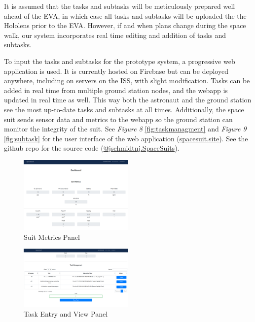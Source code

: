 \documentclass{article}
\begin{document}
It is assumed that the tasks and subtasks will be meticulously prepared well ahead of the EVA, in which case all tasks and subtasks will be uploaded the the Hololens prior to the EVA. However, if and when plans change during the space walk, our system incorporates real time editing and addition of tasks and subtasks.

To input the tasks and subtasks for the prototype system, a progressive web application is used. It is currently hosted on Firebase but can be deployed anywhere, including on servers on the ISS, with slight modification. Tasks can be added in real time from multiple ground station nodes, and the webapp is updated in real time as well. This way both the astronaut and the ground station see the most up-to-date tasks and subtasks at all times. Additionally, the space suit sends sensor data and metrics to the webapp so the ground station can monitor the integrity of the suit. See \textit{Figure 8} \ref{fig:taskmanagment} and \textit{Figure 9} \ref{fig:subtask} for the user interface of the web application (\href{https://spacesuit.site}{spacesuit.site}). See the github repo for the source code (\href{https://github.com/jschmidtnj/spacesuits}{@jschmidtnj.SpaceSuits}).

\begin{figure}[!htb]
  \centering
  \includegraphics[width=0.5\textwidth]{assets/groundcontrolsuitmetrics.png}
  \caption{Suit Metrics Panel}
  \label{fig:groundcontrolsuitmetrics}
\end{figure}

\begin{figure}[!htb]
  \centering
  \includegraphics[width=0.5\textwidth]{assets/taskmanagment.png}
  \caption{Task Entry and View Panel}
  \label{fig:syntheticfiberuse}
\end{figure}
\end{document}
